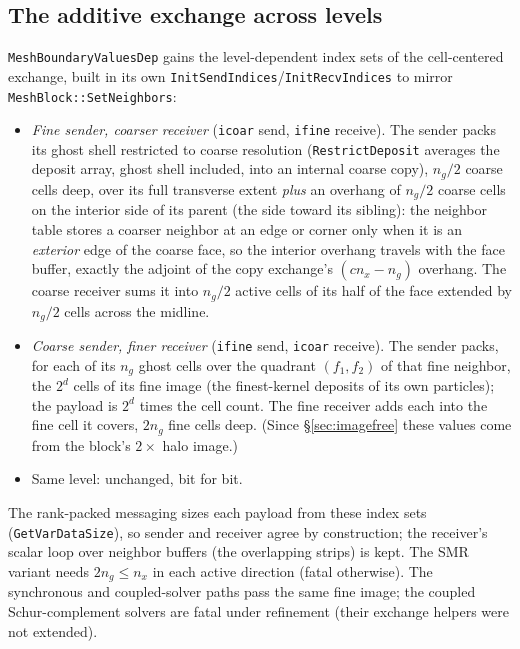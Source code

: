 \documentclass[11pt]{article}
\newcommand{\code}[1]{\texttt{#1}}
\newcommand{\fn}[1]{\texttt{\small #1}}
\begin{document}
\subsection{The additive exchange across levels}

\fn{MeshBoundaryValuesDep} gains the level-dependent index sets of the cell-centered
exchange, built in its own \fn{InitSendIndices}/\fn{InitRecvIndices} to mirror
\fn{MeshBlock::SetNeighbors}:
\begin{itemize}\itemsep2pt
\item \emph{Fine sender, coarser receiver} (\code{icoar} send, \code{ifine} receive).
      The sender packs its ghost shell restricted to coarse resolution
      (\fn{RestrictDeposit} averages the deposit array, ghost shell included, into an
      internal coarse copy), $n_g/2$ coarse cells deep, over its full transverse extent
      \emph{plus} an overhang of $n_g/2$ coarse cells on the interior side of its parent
      (the side toward its sibling): the neighbor table stores a coarser neighbor at an
      edge or corner only when it is an \emph{exterior} edge of the coarse face, so the
      interior overhang travels with the face buffer, exactly the adjoint of the copy
      exchange's $(cn_x - n_g)$ overhang. The coarse receiver sums it into $n_g/2$ active
      cells of its half of the face extended by $n_g/2$ cells across the midline.
\item \emph{Coarse sender, finer receiver} (\code{ifine} send, \code{icoar} receive).
      The sender packs, for each of its $n_g$ ghost cells over the quadrant $(f_1,f_2)$
      of that fine neighbor, the $2^d$ cells of its fine image (the finest-kernel
      deposits of its own particles); the payload is $2^d$ times the cell count. The fine
      receiver adds each into the fine cell it covers, $2n_g$ fine cells deep. (Since
      \S\ref{sec:imagefree} these values come from the block's $2\times$ halo image.)
\item Same level: unchanged, bit for bit.
\end{itemize}
The rank-packed messaging sizes each payload from these index sets
(\fn{GetVarDataSize}), so sender and receiver agree by construction; the receiver's
scalar loop over neighbor buffers (the overlapping strips) is kept. The SMR variant needs
$2n_g \le n_x$ in each active direction (fatal otherwise). The synchronous and coupled-solver
paths pass the same fine image; the coupled Schur-complement solvers are fatal under
refinement (their exchange helpers were not extended).
\end{document}
